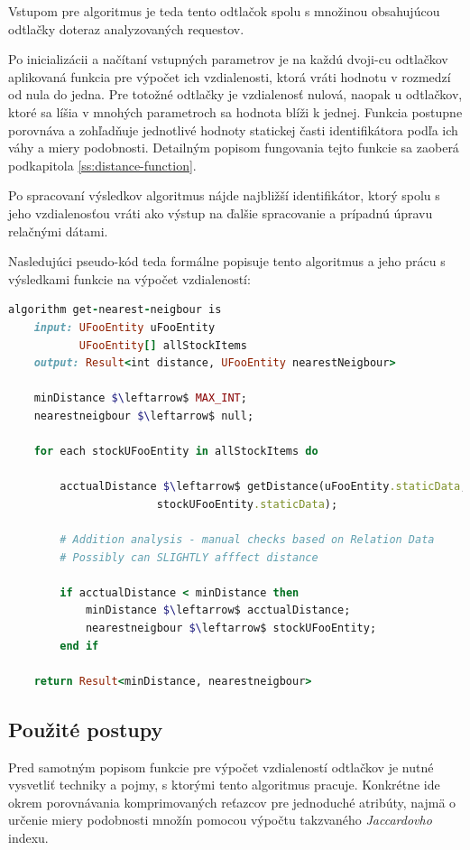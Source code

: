 \documentclass[
  printed, %
  table,   %
  lof,     %
  nolot,   %
  nocover
]{fithesis3}
\begin{document}
Vstupom pre algoritmus je teda tento odtlačok
spolu s množinou obsahujúcou odtlačky doteraz analyzovaných requestov.

Po
inicializácii a načítaní vstupných parametrov je na každú dvoji-cu odtlačkov
aplikovaná funkcia pre výpočet ich vzdialenosti, ktorá vráti hodnotu v rozmedzí
od nula do jedna. Pre totožné odtlačky je vzdialenosť nulová, naopak u
odtlačkov, ktoré sa líšia v mnohých parametroch sa hodnota blíži k jednej.
Funkcia postupne porovnáva a zohľadňuje jednotlivé hodnoty statickej časti
identifikátora podľa ich váhy a miery podobnosti. Detailným popisom fungovania
tejto funkcie sa zaoberá podkapitola \ref{ss:distance-function}. 

Po spracovaní
výsledkov algoritmus nájde najbližší identifikátor, ktorý spolu s jeho
vzdialenosťou vráti ako výstup na ďalšie spracovanie a prípadnú úpravu
relačnými dátami.

Nasledujúci pseudo-kód teda formálne popisuje tento algoritmus a jeho prácu s
výsledkami funkcie na výpočet vzdialeností:
\begin{lstlisting}[basicstyle=\footnotesize, language=Ruby, mathescape]
algorithm get-nearest-neigbour is
    input: UFooEntity uFooEntity
           UFooEntity[] allStockItems
    output: Result<int distance, UFooEntity nearestNeigbour>

    minDistance $\leftarrow$ MAX_INT;
    nearestneigbour $\leftarrow$ null;

    for each stockUFooEntity in allStockItems do

        acctualDistance $\leftarrow$ getDistance(uFooEntity.staticData,
                       stockUFooEntity.staticData);

        # Addition analysis - manual checks based on Relation Data
        # Possibly can SLIGHTLY afffect distance 

        if acctualDistance < minDistance then
            minDistance $\leftarrow$ acctualDistance;
            nearestneigbour $\leftarrow$ stockUFooEntity;
        end if
    
    return Result<minDistance, nearestneigbour>
\end{lstlisting}

\subsection{Použité postupy}
Pred samotným popisom funkcie pre výpočet vzdialeností odtlačkov je nutné
vysvetliť techniky a pojmy, s ktorými tento algoritmus pracuje. Konkrétne ide
okrem porovnávania komprimovaných reťazcov pre jednoduché atribúty, najmä o 
určenie miery podobnosti množín pomocou výpočtu takzvaného
\textit{Jaccardovho} indexu.
\end{document}
